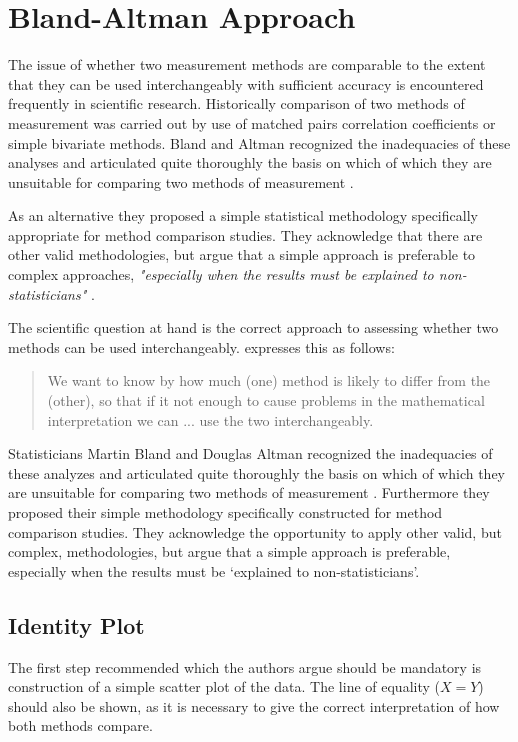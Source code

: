 \documentclass[Main.tex]{subfiles}
\begin{document}
	\section{Bland-Altman Approach}

The issue of whether two measurement methods are comparable to the extent that they can be used interchangeably with sufficient accuracy is encountered frequently in scientific research. Historically comparison of two methods of measurement was carried
out by use of matched pairs correlation coefficients or simple bivariate methods. Bland and Altman recognized the inadequacies of these analyses and articulated quite thoroughly the basis on which of which they are unsuitable for comparing two methods of measurement \citep*{BA83}.
	
As an alternative they proposed a simple statistical methodology specifically appropriate for method comparison studies. They acknowledge that there are other valid methodologies, but argue that a simple approach is preferable to complex approaches,	\emph{"especially when the results must be explained to non-statisticians"} \citep*{BA83}.

The scientific question at hand is the correct approach to
assessing whether two methods can be used interchangeably.
\citet{BA99} expresses this as follows:
\begin{quote}We want to
	know by how much (one) method is likely to differ from the
	(other), so that if it not enough to cause problems in the
	mathematical interpretation we can ... use the two
	interchangeably.
\end{quote}


Statisticians Martin Bland and Douglas Altman recognized the inadequacies of these analyzes and
articulated quite thoroughly the basis on which of which they are unsuitable for comparing two methods of measurement \citep*{BA83}. Furthermore they proposed their simple methodology specifically constructed for method comparison studies. They acknowledge the opportunity to apply other valid, but complex, methodologies, but argue that a simple approach is preferable, especially when the results must be `explained to non-statisticians'.




\subsection{Identity Plot}
The first step recommended which the authors argue should be mandatory is construction of a simple scatter plot of the data.
The line of equality ($X=Y$) should also be shown, as it is	necessary to give the correct interpretation of how both methods
compare. 
\end{document}
